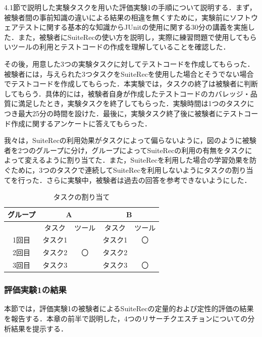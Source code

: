 \documentclass[12pt]{jarticle} %
\begin{document}
4.1節で説明した実験タスクを用いた評価実験1の手順について説明する．まず，被験者間の事前知識の違いによる結果の相違を無くすために，実験前にソフトウェアテストに関する基本的な知識からJUnitの使用に関する30分の講義を実施した．また，被験者に{\sf SuiteRec}の使い方を説明し，実際に練習問題で使用してもらいツールの利用とテストコードの作成を理解していることを確認した．

その後，用意した3つの実験タスクに対してテストコードを作成してもらった．被験者には，与えられた3つタスクを{\sf SuiteRec}を使用した場合とそうでない場合でテストコードを作成してもらった．本実験では，タスクの終了は被験者に判断してもらう．具体的には，被験者自身が作成したテストコードのカバレッジ・品質に満足したとき，実験タスクを終了してもらった．実験時間は1つのタスクにつき最大25分の時間を設けた．最後に，実験タスク終了後に被験者にテストコード作成に関するアンケートに答えてもらった．

我々は，{\sf SuiteRec}の利用効果がタスクによって偏らないように，図のように被験者を2つのグループに分け，グループによって{\sf SuiteRec}の利用の有無をタスクによって変えるように割り当てた．また，{\sf SuiteRec}を利用した場合の学習効果を防ぐために，3つのタスクで連続して{\sf SuiteRec}を利用しないようにタスクの割り当てを行った．さらに実験中，被験者は過去の回答を参考できないようにした．


\begin{table}[]
\caption{タスクの割り当て}
\begin{center}
\begin{tabular}{|c|l|l|l|c|}
\hline
グループ & \multicolumn{2}{c|}{A}                              & \multicolumn{2}{c|}{B}                           \\ \hline
     & \multicolumn{1}{c|}{タスク} & \multicolumn{1}{c|}{ツール} & \multicolumn{1}{c|}{タスク} & ツール                   \\ \hline
1回目  & タスク1                     &                          & タスク1                     & 〇                     \\ \hline
2回目  & タスク2                     & \multicolumn{1}{c|}{〇}   & タスク2                     & \multicolumn{1}{l|}{} \\ \hline
3回目  & タスク3                     &                          & タスク3                     & 〇                     \\ \hline
\end{tabular}
\end{center}
\end{table}

\subsubsection{評価実験1の結果}
本節では，評価実験1の被験者による{\sf SuiteRec}の定量的および定性的評価の結果を報告する．本章の前半で説明した，4つのリサーチクエスチョンについての分析結果を提示する．
\end{document}
